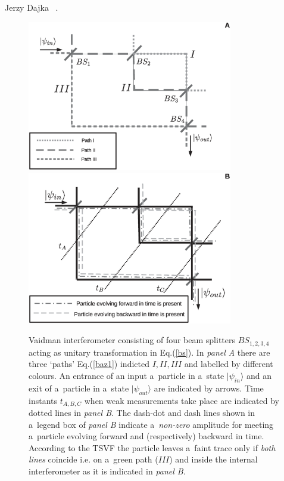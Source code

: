 \begin{artengenv}{Jerzy Dajka}
~\parencite{PhysRevA.95.032110,PhysRevA.97.046103,PhysRevA.97.046102,vaid_trans,lady}. 
\begin{figure}
\begin{center}
 \includegraphics[width=0.8\textwidth]{ART_dajka/vaid1a_bw.eps}\\%
 \includegraphics[width=0.8\textwidth]{ART_dajka/vaid1b_bw.eps}%
\end{center}
 \caption{Vaidman  interferometer consisting of four beam splitters $BS_{1,2,3,4}$ acting as unitary transformation in Eq.(\ref{bs}). In  {\it panel A} there are  three `paths' Eq.(\ref{baz1}) indicted  $I,II,III$ and labelled by different colours. An entrance of an input a~particle in a~state $|\psi_{in}\rangle$ and an exit of a~particle in a~state $|\psi_{out}\rangle$ are indicated by arrows. Time instants  $t_{A,B,C}$ when  weak measurements take place are indicated by dotted lines in  {\it panel B}. The dash-dot and dash lines shown in a~legend box of {\it panel B} indicate  a~{\it non-zero} amplitude for meeting a~particle evolving forward and (respectively) backward in time. According to the TSVF the particle leaves a~faint trace only if {\it both lines} coincide i.e. on a~green path ($III$) and inside the internal interferometer as it is indicated in {\it panel B}.}\label{fig0}
\end{figure}


\end{artengenv}
